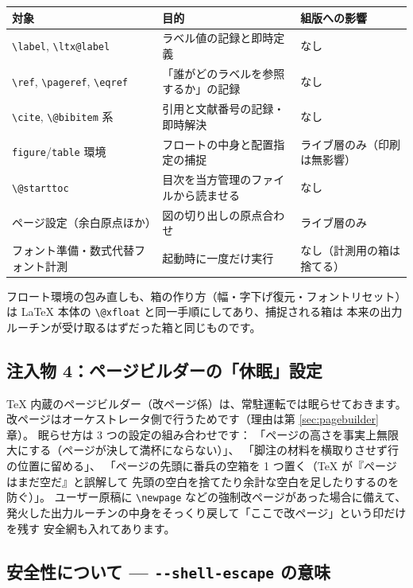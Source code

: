 \documentclass[11pt,a4paper]{ltjsarticle}
\newcommand{\code}[1]{\texttt{#1}}
\newcommand{\cs}[1]{\texttt{\textbackslash #1}}
\begin{document}
\begin{center}
\small
\begin{tabular}{lll}
\toprule
対象 & 目的 & 組版への影響 \\
\midrule
\cs{label}, \cs{ltx@label} & ラベル値の記録と即時定義 & なし \\
\cs{ref}, \cs{pageref}, \cs{eqref} & 「誰がどのラベルを参照するか」の記録 & なし \\
\cs{cite}, \cs{@bibitem} 系 & 引用と文献番号の記録・即時解決 & なし \\
\code{figure}/\code{table} 環境 & フロートの中身と配置指定の捕捉 & ライブ層のみ（印刷は無影響） \\
\cs{@starttoc} & 目次を当方管理のファイルから読ませる & なし \\
ページ設定（余白原点ほか） & 図の切り出しの原点合わせ & ライブ層のみ \\
フォント準備・数式代替フォント計測 & 起動時に一度だけ実行 & なし（計測用の箱は捨てる） \\
\bottomrule
\end{tabular}
\end{center}

フロート環境の包み直しも、箱の作り方（幅・字下げ復元・フォントリセット）は
LaTeX 本体の \cs{@xfloat} と同一手順にしてあり、捕捉される箱は
本来の出力ルーチンが受け取るはずだった箱と同じものです。

\subsection{注入物 4：ページビルダーの「休眠」設定}

TeX 内蔵のページビルダー（改ページ係）は、常駐運転では眠らせておきます。
改ページはオーケストレータ側で行うためです（理由は第 \ref{sec:pagebuilder} 章）。
眠らせ方は 3 つの設定の組み合わせです：
「ページの高さを事実上無限大にする（ページが決して満杯にならない）」、
「脚注の材料を横取りさせず行の位置に留める」、
「ページの先頭に番兵の空箱を 1 つ置く（TeX が『ページはまだ空だ』と誤解して
先頭の空白を捨てたり余計な空白を足したりするのを防ぐ）」。
ユーザー原稿に \cs{newpage} などの強制改ページがあった場合に備えて、
発火した出力ルーチンの中身をそっくり戻して「ここで改ページ」という印だけを残す
安全網も入れてあります。

\subsection{安全性について --- \code{-{}-shell-escape} の意味}
\end{document}
